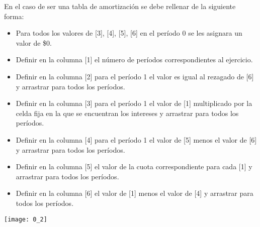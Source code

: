 \begin{enumerate}
    En el caso de ser una tabla de amortización se debe rellenar de la siguiente forma: 
    \begin{itemize}
        \color{ForestGreen}
        \item Para todos los valores de [3], [4], [5], [6] en el período 0 se les asignara un valor de \$0.
        \item Definir en la columna [1] el número de períodos correspondientes al ejercicio.
        \item Definir en la columna [2] para el período 1 el valor es igual al rezagado de [6] y arrastrar para todos los períodos.
        \item Definir en la columna [3] para el período 1 el valor de [1] multiplicado por la celda fija en la que se encuentran los intereses y arrastrar para todos los períodos.
        \item Definir en la columna [4] para el período 1 el valor de [5] menos el valor de [6] y arrastrar para todos los períodos.
        \item Definir en la columna [5] el valor de la cuota correspondiente para cada [1] y arrastrar para todos los períodos.
        \item Definir en la columna [6] el valor de [1] menos el valor de [4] y arrastrar para todos los períodos.
    \end{itemize}
    \begin{center}
    \texttt{[image: 0\_2]}
    \end{center}
    

\end{enumerate}
